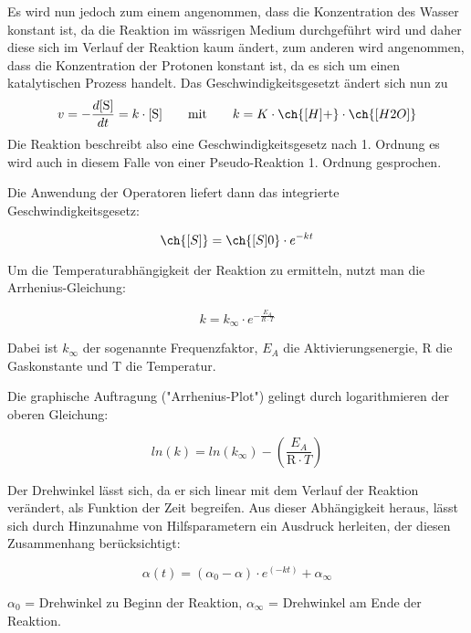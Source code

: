Es wird nun jedoch zum einem angenommen, dass die Konzentration des Wasser konstant ist, da die Reaktion im wässrigen Medium durchgeführt wird und daher diese sich im Verlauf der Reaktion kaum ändert, zum anderen wird angenommen, dass die Konzentration der Protonen konstant ist, da es sich um einen katalytischen Prozess handelt. Das Geschwindigkeitsgesetzt ändert sich nun zu
\begin{equation}
v = - \frac{d \text{[S]}}{dt}= k \cdot \text{[S]}
\quad\quad \text{mit}\quad\quad  k=K\cdot\ch{\text{[}H\text{]}+} \cdot \ch{[H2O]}
\end{equation}
Die Reaktion beschreibt also eine Geschwindigkeitsgesetz nach  1. Ordnung es wird auch in diesem Falle von einer Pseudo-Reaktion 1. Ordnung gesprochen. 



Die Anwendung der Operatoren liefert dann das integrierte Geschwindigkeitsgesetz:

\begin{equation}
\ch{[S]} = \ch{[S]0}\cdot e^{-kt}
\end{equation}

Um die Temperaturabhängigkeit der Reaktion zu ermitteln, nutzt man die Arrhenius-Gleichung:

\begin{equation}
k=k_\infty \cdot e^{ - \frac{E_A}{R \cdot T}}
\end{equation}

Dabei ist $k_\infty$ der sogenannte Frequenzfaktor, $E_A$ die Aktivierungsenergie, R die Gaskonstante und T die Temperatur.

Die graphische Auftragung ("Arrhenius-Plot") gelingt durch logarithmieren der oberen Gleichung:

\begin{equation}
ln(k)=ln(k_\infty)-\left( \frac{E_A}{ \text{R} \cdot T} \right)
\end{equation}

Der Drehwinkel lässt sich, da er sich linear mit dem Verlauf der Reaktion verändert, als Funktion der Zeit begreifen. Aus dieser Abhängigkeit heraus, lässt sich durch Hinzunahme von Hilfsparametern ein Ausdruck herleiten, der diesen Zusammenhang berücksichtigt:

\begin{equation}
\alpha(t)=(\alpha_0-\alpha)\cdot e^{(-kt)}+\alpha_\infty
\end{equation}

$\alpha_0$ = Drehwinkel zu Beginn der Reaktion, $\alpha_\infty$ = Drehwinkel am Ende der Reaktion.



